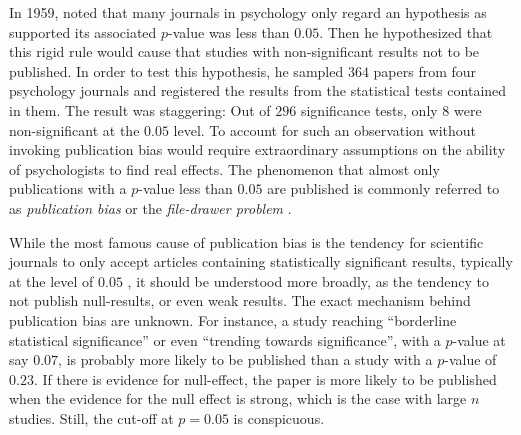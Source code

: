 In 1959, \citeauthor{Sterling1959-cq} noted that many journals in psychology only regard an hypothesis as supported its associated $p$-value was less than $0.05$. Then he hypothesized that this rigid rule would cause that studies with non-significant results not to be published. In order to test this hypothesis, he sampled $364$ papers from four psychology journals and registered the results from the statistical tests contained in them. The result was staggering: Out of $296$ significance tests, only $8$ were non-significant at the $0.05$ level. To account for such an observation without invoking publication bias would require extraordinary assumptions on the ability of psychologists to find real effects. The phenomenon that almost only publications with a $p$-value less than $0.05$ are published is commonly referred to as \emph{publication bias} or the \emph{file-drawer
problem} .

While the most famous cause of publication bias is the tendency for scientific journals to only accept articles containing statistically significant results, typically at the level of $0.05$ , it should be understood more broadly, as the tendency to not publish null-results, or even weak results. The exact mechanism behind publication bias are unknown. For instance, a study reaching ``borderline statistical significance'' or even ``trending towards significance'', with a $p$-value at say $0.07$, is probably more likely to be published than a study with a $p$-value of $0.23$. If there is evidence for null-effect, the paper is more likely to be published when the evidence for the null effect is strong, which is the case with large $n$ studies. Still, the cut-off at $p = 0.05$ is conspicuous. 

